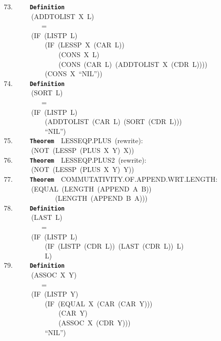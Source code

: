 \documentclass[11pt]{book}
\newenvironment{pubasis}{\begin{flushleft}\ttfamily\small}{\normalsize\rmfamily\end{flushleft}}
\newcommand{\axiomordefinition}[1]{\vspace{6pt}\texttt{\textbf{#1}}}
\begin{document}
\begin{pubasis}
73.~~~~~\axiomordefinition{Definition}\\
~~~~~~~~(ADDTOLIST~X~L)\\
~~~~~~~~~~~=\\
~~~~~~~~(IF~(LISTP~L)\\
~~~~~~~~~~~~(IF~(LESSP~X~(CAR~L))\\
~~~~~~~~~~~~~~~~(CONS~X~L)\\
~~~~~~~~~~~~~~~~(CONS~(CAR~L)~(ADDTOLIST~X~(CDR~L))))\\
~~~~~~~~~~~~(CONS~X~``NIL''))\\

74.~~~~~\axiomordefinition{Definition}\\
~~~~~~~~(SORT~L)\\
~~~~~~~~~~~=\\
~~~~~~~~(IF~(LISTP~L)\\
~~~~~~~~~~~~(ADDTOLIST~(CAR~L)~(SORT~(CDR~L)))\\
~~~~~~~~~~~~``NIL'')\\

75.~~~~~\axiomordefinition{Theorem}~~LESSEQP.PLUS~(rewrite):\\
~~~~~~~~(NOT~(LESSP~(PLUS~X~Y)~X))\\

76.~~~~~\axiomordefinition{Theorem}~~LESSEQP.PLUS2~(rewrite):\\
~~~~~~~~(NOT~(LESSP~(PLUS~X~Y)~Y))\\

77.~~~~~\axiomordefinition{Theorem}~~COM\-MU\-TA\-TIV\-ITY.OF.APPEND.WRT.LENGTH:\\
~~~~~~~~(EQUAL~(LENGTH~(APPEND~A~B))\\
~~~~~~~~~~~~~~~(LENGTH~(APPEND~B~A)))\\

78.~~~~~\axiomordefinition{Definition}\\
~~~~~~~~(LAST~L)\\
~~~~~~~~~~~=\\
~~~~~~~~(IF~(LISTP~L)\\
~~~~~~~~~~~~(IF~(LISTP~(CDR~L))~(LAST~(CDR~L))~L)\\
~~~~~~~~~~~~L)\\

79.~~~~~\axiomordefinition{Definition}\\
~~~~~~~~(ASSOC~X~Y)\\
~~~~~~~~~~~=\\
~~~~~~~~(IF~(LISTP~Y)\\
~~~~~~~~~~~~(IF~(EQUAL~X~(CAR~(CAR~Y)))\\
~~~~~~~~~~~~~~~~(CAR~Y)\\
~~~~~~~~~~~~~~~~(ASSOC~X~(CDR~Y)))\\
~~~~~~~~~~~~``NIL'')\\


\end{pubasis}
\end{document}
